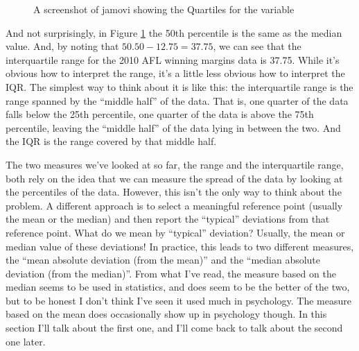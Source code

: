 \vspace{1cm}
\begin{figure}[ht]
\begin{center}
\caption{A screenshot of jamovi showing the Quartiles for the  variable }
\label{fig:aflsmall_margins_iqr}
\HR
\end{center}
\end{figure}

And not surprisingly, in Figure \ref{fig:aflsmall_margins_iqr} the 50th percentile is the same as the median value. And, by noting that $50.50 - 12.75 = 37.75$, we can see that the interquartile range for the 2010 AFL winning margins data is 37.75. While it's obvious how to interpret the range, it's a little less obvious how to interpret the IQR. The simplest way to think about it is like this: the interquartile range is the range spanned by the ``middle half'' of the data. That is, one quarter of the data falls below the 25th percentile, one quarter of the data is above the 75th percentile, leaving the ``middle half'' of the data lying in between the two. And the IQR is the range covered by that middle half.



The two measures we've looked at so far, the range and the interquartile range, both rely on the idea that we can measure the spread of the data by looking at the percentiles of the data. However, this isn't the only way to think about the problem. A different approach is to select a meaningful reference point (usually the mean or the median) and then report the ``typical'' deviations from that reference point. What do we mean by ``typical'' deviation? Usually, the mean or median value of these deviations! In practice, this leads to two different measures, the ``mean absolute deviation (from the mean)'' and the ``median absolute deviation (from the median)''. From what I've read, the measure based on the median seems to be used in statistics, and does seem to be the better of the two, but to be honest I don't think I've seen it used much in psychology. The measure based on the mean does occasionally show up in psychology though. In this section I'll talk about the first one, and I'll come back to talk about the second one later.

